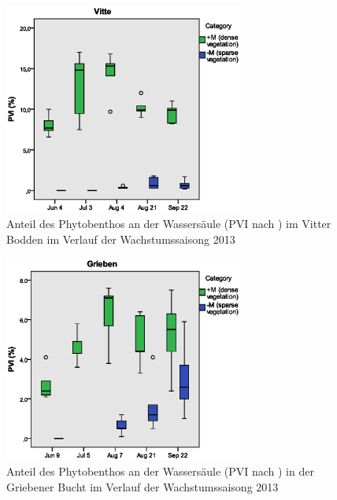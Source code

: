 \begin{figure}[!htb]
\centering
\includegraphics[width=0.70\textwidth]{images/pvi/boxplot_pvi1.eps}
\caption[PVI, Vitte]{Anteil des Phytobenthos an der Wassersäule (PVI nach \cite{jeppesen_1998}) im Vitter Bodden im Verlauf der Wachstumssaisong 2013}
\label{fig:pvi_vitte}
\end{figure}

\begin{figure}[!htb]
\centering
\includegraphics[width=0.70\textwidth]{images/pvi/boxplot_pvi2.eps}
\caption[PVI, Grieben]{Anteil des Phytobenthos an der Wassersäule (PVI nach \cite{jeppesen_1998}) in der Griebener Bucht im Verlauf der Wachstumssaisong 2013}
\label{fig:pvi_grieben}
\end{figure}

\FloatBarrier




